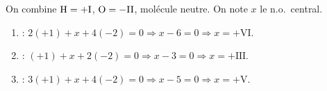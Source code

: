 \documentclass[11pt,a4paper]{article}
\begin{document}
\begin{corrige}
On combine $\ce{H}=+\mathrm{I}$, $\ce{O}=-\mathrm{II}$, molécule neutre. On note $x$ le n.o.\ central.
\begin{enumerate}[label=\alph*)]
  \item {} : $2(+1)+x+4(-2)=0 \Rightarrow x-6=0 \Rightarrow x=+\mathrm{VI}$.
  \item {} : $(+1)+x+2(-2)=0 \Rightarrow x-3=0 \Rightarrow x=+\mathrm{III}$.
  \item {} : $3(+1)+x+4(-2)=0 \Rightarrow x-5=0 \Rightarrow x=+\mathrm{V}$.
\end{enumerate}
\end{corrige}
\end{document}
